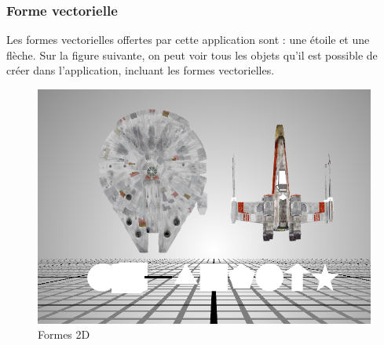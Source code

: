\subsubsection{Forme vectorielle}
Les formes vectorielles offertes par cette application sont : une étoile et une flèche.
Sur la figure suivante, on peut voir tous les objets qu'il est possible de créer dans l'application, incluant les formes vectorielles.
\begin{figure}[H]
    \centering
	\includegraphics[scale=0.8]{fig/shapes.PNG}
	\caption{Formes 2D}
	\label{fig:formes2D}
\end{figure}

